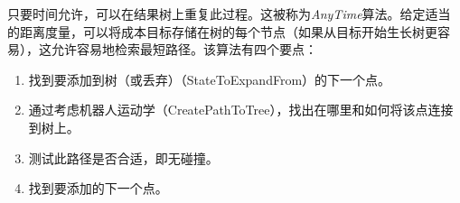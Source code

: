 
只要时间允许，可以在结果树上重复此过程。这被称为\emph{AnyTime}算法。给定适当的距离度量，可以将成本目标存储在树的每个节点（如果从目标开始生长树更容易），这允许容易地检索最短路径。该算法有四个要点：

\begin{enumerate}

\item 找到要添加到树（或丢弃）（StateToExpandFrom）的下一个点。
\item 通过考虑机器人运动学（CreatePathToTree），找出在哪里和如何将该点连接到树上。
\item 测试此路径是否合适，即无碰撞。
\item 找到要添加的下一个点。
\end{enumerate}




